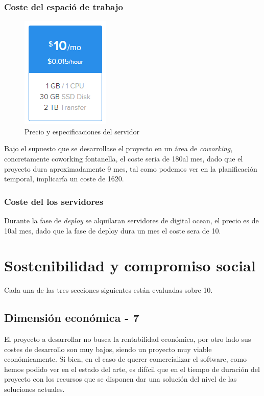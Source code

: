 \documentclass[12pt]{article} %
\begin{document}
\subsubsection{Coste del espació de trabajo}

\begin{figure}
\begin{center}
\includegraphics{add/do_server.PNG}
\caption{Precio y especificaciones del servidor}
\end{center}
\label{fig:do_server}
\end{figure}

Bajo el supuesto que se desarrollase el proyecto en un área de \textit{coworking}, concretamente coworking fontanella, el coste seria de 180\euros al mes, dado que el proyecto dura aproximadamente 9 mes, tal como podemos ver en la planificación temporal, implicaría un coste de 1620\euros.

\subsubsection{Coste del los servidores}
Durante la fase de \textit{deploy} se alquilaran servidores de digital ocean, el precio es de 10\euros al mes, dado que la fase de deploy dura un mes el coste sera de 10\euros .\linebreak

\newpage

\section{Sostenibilidad y compromiso social}
Cada una de las tres secciones siguientes están evaluadas sobre 10.
\subsection{Dimensión económica - 7}
El proyecto a desarrollar no busca la rentabilidad económica, por otro lado sus costes de desarrollo son muy bajos, siendo un proyecto muy viable económicamente. Si bien, en el caso de querer comercializar el software, como hemos podido ver en el estado del arte, es difícil que en el tiempo de duración del proyecto con los recursos que se disponen dar una solución del nivel de las soluciones actuales.
\end{document}

